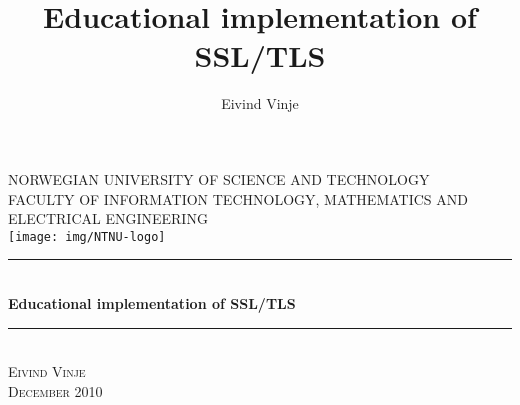 \documentclass[12pt,b5paper,titlepage]{report}
\begin{document}
\sloppy

\title{Educational implementation of SSL/TLS}
\author{Eivind Vinje}

\begin{titlepage}
\begin{center}
\textsc{NORWEGIAN UNIVERSITY OF SCIENCE AND TECHNOLOGY\\
FACULTY OF  INFORMATION TECHNOLOGY, MATHEMATICS AND ELECTRICAL ENGINEERING} \\
\vspace{0.5cm} 
\texttt{[image: img/NTNU-logo]} \\
\vspace{2.5cm} 
\rule{\linewidth}{0.5mm} \\[0.4cm]
{\huge \bfseries Educational implementation of SSL/TLS}\\[0.4cm] 
\rule{\linewidth}{0.5mm} \\[3.5cm]
\textsc{\Large Eivind Vinje}\\[1.4cm]
\textsc{\Large December 2010}\\
\end{center}
\end{titlepage}
\end{document}
